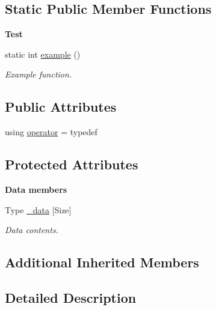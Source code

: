 \subsection*{Static Public Member Functions}
\begin{Indent}{\bf Test}\par
\begin{DoxyCompactItemize}
\item 
static int \hyperlink{exceptionmagrathea_1_1NArray_aad23f5de773bda14e5fa0e6e4d2e9605}{example} ()
\begin{DoxyCompactList}\small\item\em Example function. \end{DoxyCompactList}\end{DoxyCompactItemize}
\end{Indent}
\subsection*{Public Attributes}
\begin{DoxyCompactItemize}
\item 
using \hyperlink{exceptionmagrathea_1_1NArray_aa6eab16c5ba3cc719553a2465f0319df}{operator} = typedef
\end{DoxyCompactItemize}
\subsection*{Protected Attributes}
\begin{Indent}{\bf Data members}\par
\begin{DoxyCompactItemize}
\item 
Type \hyperlink{exceptionmagrathea_1_1NArray_a9bc055609b16d71846679d87b367934c}{\-\_\-data} \mbox{[}Size\mbox{]}
\begin{DoxyCompactList}\small\item\em Data contents. \end{DoxyCompactList}\end{DoxyCompactItemize}
\end{Indent}
\subsection*{Additional Inherited Members}


\subsection{Detailed Description}
